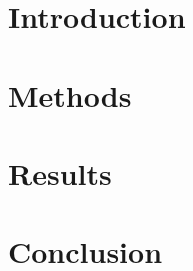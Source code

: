 \documentclass[a4paper, 12pt]{article}
\begin{document}



\hypersetup{linkcolor=black}
\tableofcontents
\hypersetup{linkcolor=red!60!black}
\newpage
\section{Introduction} \label{sec: intro}


\section{Methods}\label{sec: methods}


\section{Results}\label{sec: results}


\section{Conclusion}
\label{sec: conclusion}
\newpage


%
%
{}
\printbibliography

\end{document}

